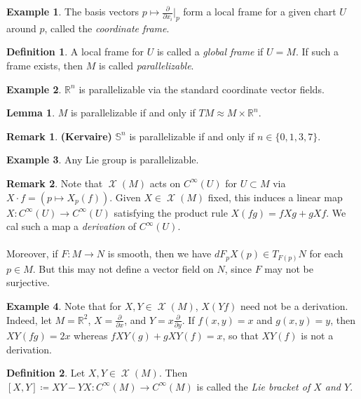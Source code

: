 \documentclass[10pt,letterpaper,cm]{nupset}
\theoremstyle{definition}
\newtheorem*{definition}{Definition}
\newtheorem{exmp}{Example}
\newtheorem{remark}{Remark}
\newtheorem{lemma}{Lemma}
\newcommand{\R}{\mathbb R}
\renewcommand{\S}{\mathbb S}
\newcommand{\1}{\mathbf{1}}
\newcommand{\0}{\vec 0}
\DeclareMathOperator{\vf}{\mathscr{X}}
\begin{document}
\begin{exmp}
The basis vectors $p\mapsto \frac{\partial}{\partial{x_i}}\rvert_p$ form a local frame for a given chart $U$ around $p$, called the \textit{coordinate frame}.
\end{exmp}

\begin{definition}
A  local frame for $U$ is called a \textit{global frame} if $U =M$. If such a frame exists, then $M$ is called \textit{parallelizable}.
\end{definition}

\begin{exmp}
$\R^n$ is parallelizable via the standard coordinate vector fields.
\end{exmp}

\begin{lemma}
$M$ is parallelizable if and only if $TM \approx M \times \R^n$.
\end{lemma}

\begin{remark}{\textbf{(Kervaire)}}
$\S^n$ is parallelizable if and only if $n\in \{0, 1, 3, 7\}$.
\end{remark}

\begin{exmp}
Any Lie group is parallelizable. 
\end{exmp}

\begin{remark}
Note that $\vf(M)$ acts on $C^{\infty}(U)$ for $U \subset M$ via $X \cdot f = (p \mapsto X_p(f))$. Given $X \in \vf(M)$ fixed, this induces a linear map $X : C^{\infty}(U) \to C^{\infty}(U)$ satisfying the product rule $X(fg) = fXg  + gXf$. We cal such a map a \textit{derivation} of $C^{\infty}(U)$.
\\ \\ Moreover, if $F: M \to N$ is smooth, then we have $dF_pX(p) \in T_{F(p)}N$ for each $p \in M$. But this may not define a vector field on $N$, since $F$ may not be surjective.
\end{remark}

\begin{exmp}
Note that for $X, Y \in \vf(M)$, $X(Yf)$ need not be a derivation. Indeed, let $M= \R^2$, $X= \frac{\partial}{\partial{x}}$, and $Y = x \frac{\partial}{\partial{y}}$. If $f(x,y)=x$ and $g(x, y) = y$, then $XY(fg) = 2x$ whereas $fXY(g) + gXY(f) = x$, so that $XY(f)$ is not a derivation.
\end{exmp}

\begin{definition}
Let $X, Y \in \vf(M)$. Then $[X, Y] \coloneqq  XY - YX : C^{\infty}(M)\to C^{\infty}(M)$ is called the \textit{Lie bracket of $X$ and $Y$}.
\end{definition}
\end{document}
